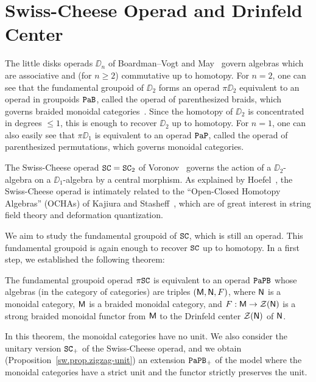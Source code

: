 \chapter{Swiss-Cheese Operad and Drinfeld Center}
\label{chap.1}

The little disks operads $\DD_{n}$ of Boardman--Vogt and May~\cite{BoardmanVogt1973,May1972} govern algebras which are associative and (for $n \geq 2$) commutative up to homotopy.
For $n=2$, one can see that the fundamental groupoid of $\DD_{2}$ forms an operad $\pi \DD_{2}$ equivalent to an operad in groupoids $\mathtt{PaB}$, called the operad of parenthesized braids, which governs braided monoidal categories~\cite[§I.6]{Fresse2017}.
Since the homotopy of $\DD_{2}$ is concentrated in degrees $\leq 1$, this is enough to recover $\DD_{2}$ up to homotopy.
For $n=1$, one can also easily see that $\pi\DD_{1}$ is equivalent to an operad $\mathtt{PaP}$, called the operad of parenthesized permutations, which governs monoidal categories.

The Swiss-Cheese operad $\mathtt{SC} = \mathtt{SC}_{2}$ of Voronov~\cite{Voronov1999} governs the action of a $\DD_{2}$-algebra on a $\DD_{1}$-algebra by a central morphism.
As explained by Hoefel~\cite{Hoefel2009}, the Swiss-Cheese operad is intimately related to the ``Open-Closed Homotopy Algebras'' (OCHAs) of Kajiura and Stasheff~\cite{KajiuraStasheff2006}, which are of great interest in string field theory and deformation quantization.

We aim to study the fundamental groupoid of $\mathtt{SC}$, which is still an operad.
This fundamental groupoid is again enough to recover $\mathtt{SC}$ up to homotopy.
In a first step, we established the following theorem:

\begin{theoremintro}
  \label{sw.thm.A}
  The fundamental groupoid operad $\pi \mathtt{SC}$ is equivalent to an operad $\mathtt{PaPB}$ whose algebras (in the category of categories) are triples $(\mathsf{M}, \mathsf{N}, F)$, where $\mathsf{N}$ is a monoidal category, $\mathsf{M}$ is a braided monoidal category, and $F : \mathsf{M} \to \mathcal{Z}(\mathsf{N})$ is a strong braided monoidal functor from $\mathsf{M}$ to the Drinfeld center $\mathcal{Z}(\mathsf{N})$ of $\mathsf{N}$.
\end{theoremintro}

In this theorem, the monoidal categories have no unit.
We also consider the unitary version $\mathtt{SC}_{+}$ of the Swiss-Cheese operad, and we obtain (Proposition~\ref{sw.prop.zigzag-unit}) an extension $\mathtt{PaPB}_{+}$ of the model where the monoidal categories have a strict unit and the functor strictly preserves the unit.

